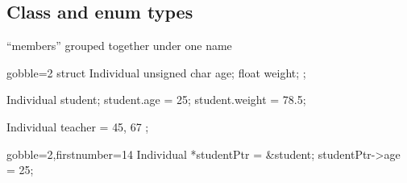 \subsection[Class/Enum]{Class and enum types}

\begin{frame}[fragile]
  \begin{mdframed}[style=simplebox]
    \center ``members'' grouped together under one name
  \end{mdframed}
  \begin{multicols}{2}
    \begin{cppcode*}{gobble=2}
      struct Individual {
        unsigned char age;
        float weight;
      };

      Individual student;
      student.age = 25;
      student.weight = 78.5;

      Individual teacher = {
        45, 67
      };
    \end{cppcode*}
    \columnbreak
    \begin{cppcode*}{gobble=2,firstnumber=14}
      Individual *studentPtr =
        &student;
      studentPtr->age = 25;
    \end{cppcode*}
    \pause
    \vfill
    \hspace{-1.5cm}
    \vfill \null
  \end{multicols}
\end{frame}

